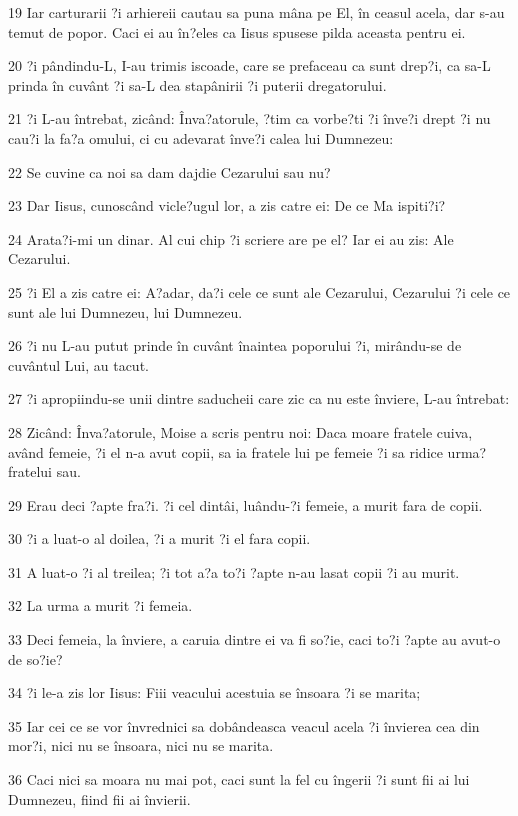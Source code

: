 \par 19 Iar carturarii ?i arhiereii cautau sa puna mâna pe El, în ceasul acela, dar s-au temut de popor. Caci ei au în?eles ca Iisus spusese pilda aceasta pentru ei.
\par 20 ?i pândindu-L, I-au trimis iscoade, care se prefaceau ca sunt drep?i, ca sa-L prinda în cuvânt ?i sa-L dea stapânirii ?i puterii dregatorului.
\par 21 ?i L-au întrebat, zicând: Înva?atorule, ?tim ca vorbe?ti ?i înve?i drept ?i nu cau?i la fa?a omului, ci cu adevarat înve?i calea lui Dumnezeu:
\par 22 Se cuvine ca noi sa dam dajdie Cezarului sau nu?
\par 23 Dar Iisus, cunoscând vicle?ugul lor, a zis catre ei: De ce Ma ispiti?i?
\par 24 Arata?i-mi un dinar. Al cui chip ?i scriere are pe el? Iar ei au zis: Ale Cezarului.
\par 25 ?i El a zis catre ei: A?adar, da?i cele ce sunt ale Cezarului, Cezarului ?i cele ce sunt ale lui Dumnezeu, lui Dumnezeu.
\par 26 ?i nu L-au putut prinde în cuvânt înaintea poporului ?i, mirându-se de cuvântul Lui, au tacut.
\par 27 ?i apropiindu-se unii dintre saducheii care zic ca nu este înviere, L-au întrebat:
\par 28 Zicând: Înva?atorule, Moise a scris pentru noi: Daca moare fratele cuiva, având femeie, ?i el n-a avut copii, sa ia fratele lui pe femeie ?i sa ridice urma? fratelui sau.
\par 29 Erau deci ?apte fra?i. ?i cel dintâi, luându-?i femeie, a murit fara de copii.
\par 30 ?i a luat-o al doilea, ?i a murit ?i el fara copii.
\par 31 A luat-o ?i al treilea; ?i tot a?a to?i ?apte n-au lasat copii ?i au murit.
\par 32 La urma a murit ?i femeia.
\par 33 Deci femeia, la înviere, a caruia dintre ei va fi so?ie, caci to?i ?apte au avut-o de so?ie?
\par 34 ?i le-a zis lor Iisus: Fiii veacului acestuia se însoara ?i se marita;
\par 35 Iar cei ce se vor învrednici sa dobândeasca veacul acela ?i învierea cea din mor?i, nici nu se însoara, nici nu se marita.
\par 36 Caci nici sa moara nu mai pot, caci sunt la fel cu îngerii ?i sunt fii ai lui Dumnezeu, fiind fii ai învierii.
